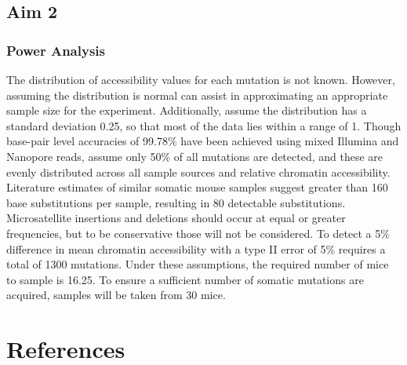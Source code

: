 \subsection{Aim 2}


\subsubsection{Power Analysis}

The distribution of accessibility values for each mutation is not known. However, assuming the distribution is normal can assist in approximating an appropriate sample size for the experiment. Additionally, assume the distribution has a standard deviation 0.25, so that most of the data lies within a range of 1. Though base-pair level accuracies of 99.78\% have been achieved using mixed Illumina and Nanopore reads, assume only 50\% of all mutations are detected, and these are evenly distributed across all sample sources and relative chromatin accessibility. Literature estimates \parencite{behjati_genome_2014} of similar somatic mouse samples suggest greater than 160 base substitutions per sample, resulting in 80 detectable substitutions. Microsatellite insertions and deletions should occur at equal or greater frequencies, but to be conservative those will not be considered. To detect a 5\% difference in mean chromatin accessibility with a type II error of 5\% requires a total of 1300 mutations. Under these assumptions, the required number of mice to sample is 16.25. To ensure a sufficient number of somatic mutations are acquired, samples will be taken from 30 mice.


\section{References} %

